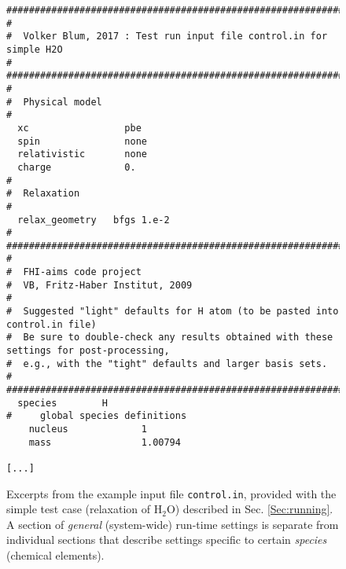\begin{figure}
  \small
  \begin{verbatim}
#########################################################################################
#
#  Volker Blum, 2017 : Test run input file control.in for simple H2O
#
#########################################################################################
#
#  Physical model
#
  xc                 pbe
  spin               none
  relativistic       none
  charge             0.
#
#  Relaxation
#
  relax_geometry   bfgs 1.e-2
#
################################################################################
#
#  FHI-aims code project
#  VB, Fritz-Haber Institut, 2009
#
#  Suggested "light" defaults for H atom (to be pasted into control.in file)
#  Be sure to double-check any results obtained with these settings for post-processing,
#  e.g., with the "tight" defaults and larger basis sets.
#
################################################################################
  species        H
#     global species definitions
    nucleus             1
    mass                1.00794

[...]

  \end{verbatim}
  \normalsize

  \vspace*{-4.0ex}

  \caption{\label{Fig:control.in}
    Excerpts from the example input file \texttt{control.in}, provided with the simple
    test case (relaxation of H$_2$O) described in Sec. \ref{Sec:running}. A
    section of \emph{general} (system-wide) run-time settings is separate from
    individual sections that describe settings specific to certain
    \emph{species} (chemical elements).
  }
\end{figure}

